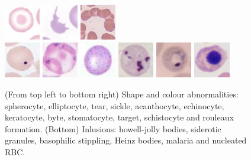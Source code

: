 \documentclass[final,a4paper,12pt,english]{UnicaPhdThesis3}
\begin{document}
\begin{figure}[!htbp]
	\includegraphics[width=0.14\textwidth]{images/2016_2_sitis/Target}
	\includegraphics[width=0.14\textwidth]{images/2016_2_sitis/schistocyte}
	\includegraphics[width=0.14\textwidth]{images/2016_2_sitis/reulex}\\
	\includegraphics[width=0.14\textwidth]{images/2016_2_sitis/Howell}
	\includegraphics[width=0.14\textwidth]{images/2016_2_sitis/siderotic}
	\includegraphics[width=0.14\textwidth]{images/2016_2_sitis/basophilic}
	\includegraphics[width=0.14\textwidth]{images/2016_2_sitis/Heinz}
	\includegraphics[width=0.14\textwidth]{images/2016_2_sitis/Malaria}
	\includegraphics[width=0.14\textwidth]{images/2016_2_sitis/nucleated}
	\caption{\label{fig:RBCs} (From top left to bottom right) Shape and colour abnormalities: spherocyte, elliptocyte, tear, sickle, acanthocyte, echinocyte, keratocyte, byte, stomatocyte, target, schistocyte and rouleaux formation.
		(Bottom) Inlusions: howell-jolly bodies, siderotic granules, basophilic stippling, Heinz bodies, malaria and nucleated RBC.}
\end{figure}
\end{document}
